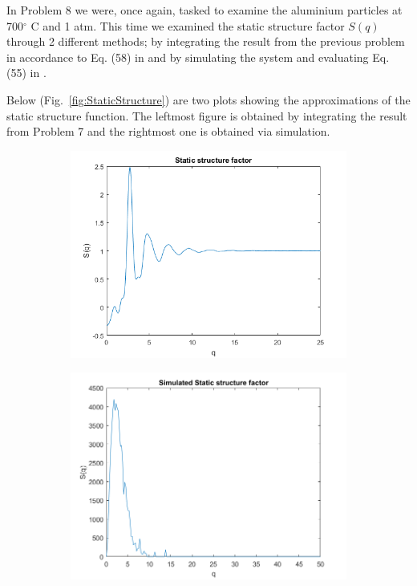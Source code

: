 In Problem 8 we were, once again, tasked to examine the aluminium particles at 700$^\circ$ C and 1 atm. This time we examined the static structure factor $S(q)$ through 2 different methods; by integrating the result from the previous problem in accordance to Eq. (58) in \cite{lecnotes} and by simulating the system and evaluating Eq. (55) in \cite{lecnotes}.

Below (Fig.~\ref{fig:StaticStructure}) are two plots showing the approximations of the static structure function. The leftmost figure is obtained by integrating the result from Problem 7 and the rightmost one is obtained via simulation. 

\begin{figure}[H]
    \centering
    \captionsetup[subfigure]{justification=centering}
    \begin{subfigure}[b]{0.40\textwidth}
        \centering
        \includegraphics[width=\textwidth]{graphics/task8/integral.png}
    \end{subfigure}
    \begin{subfigure}[b]{0.40\textwidth}
        \centering
        \includegraphics[width=\textwidth]{graphics/task8/simulated.png}

\end{subfigure}
\end{figure}
